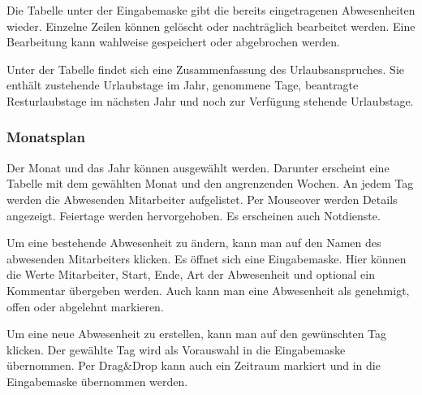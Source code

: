Die Tabelle unter der Eingabemaske gibt die bereits eingetragenen Abwesenheiten wieder.
Einzelne Zeilen können gelöscht  oder nachträglich bearbeitet  werden. Eine Bearbeitung kann wahlweise gespeichert  oder abgebrochen werden.

Unter der Tabelle findet sich eine Zusammenfassung des Urlaubsanspruches. Sie enthält zustehende Urlaubstage im Jahr, genommene Tage, beantragte Resturlaubstage im nächsten Jahr und noch zur Verfügung stehende Urlaubstage.

\subsubsection{Monatsplan}
\begin{description}
    \item {}
\end{description}
Der Monat und das Jahr können ausgewählt werden. Darunter erscheint eine Tabelle mit dem gewählten Monat und den angrenzenden Wochen.
An jedem Tag werden die Abwesenden Mitarbeiter aufgelistet. Per Mouseover werden Details angezeigt.
Feiertage werden hervorgehoben. Es erscheinen auch Notdienste.

Um eine bestehende Abwesenheit zu ändern, kann man auf den Namen des abwesenden Mitarbeiters klicken. Es öffnet sich eine Eingabemaske. Hier können die Werte Mitarbeiter, Start, Ende, Art der Abwesenheit und optional ein Kommentar übergeben werden. Auch kann man eine Abwesenheit als genehmigt, offen oder abgelehnt markieren.

Um eine neue Abwesenheit zu erstellen, kann man auf den gewünschten Tag klicken. Der gewählte Tag wird als Vorauswahl in die Eingabemaske übernommen. Per Drag\&Drop kann auch ein Zeitraum markiert und in die Eingabemaske übernommen werden.

